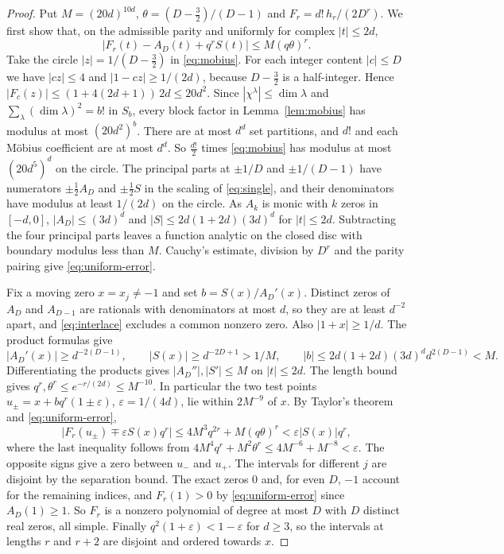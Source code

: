 \documentclass[11pt,a4paper]{article}
\theoremstyle{definition}\newtheorem{definition}[theorem]{Definition}
\theoremstyle{remark}\newtheorem{remark}[theorem]{Remark}\newtheorem{example}[theorem]{Example}
\numberwithin{equation}{section}
\begin{document}
\begin{proof}
Put $M=(20d)^{10d}$, $\theta=(D-\frac32)/(D-1)$ and $F_r=d!\,h_r/(2D^r)$. We first show that, on the admissible parity and uniformly for complex $|t|\le2d$,
\begin{equation}\label{eq:uniform-error}
 \bigl|F_r(t)-A_D(t)+q^rS(t)\bigr|\le M(q\theta)^r .
\end{equation}
Take the circle $|z|=1/(D-\frac32)$ in \eqref{eq:mobius}. For each integer content $|c|\le D$ we have $|cz|\le4$ and $|1-cz|\ge1/(2d)$, because $D-\frac32$ is a half-integer. Hence $|F_c(z)|\le(1+4(2d+1))\,2d\le20d^2$. Since $|\chi^\lambda|\le\dim\lambda$ and $\sum_\lambda(\dim\lambda)^2=b!$ in $S_b$, every block factor in Lemma~\ref{lem:mobius} has modulus at most $(20d^2)^b$. There are at most $d^d$ set partitions, and $d!$ and each Möbius coefficient are at most $d^d$. So $\frac{d!}2$ times \eqref{eq:mobius} has modulus at most $(20d^5)^d$ on the circle. The principal parts at $\pm1/D$ and $\pm1/(D-1)$ have numerators $\pm\frac12A_D$ and $\pm\frac12S$ in the scaling of \eqref{eq:single}, and their denominators have modulus at least $1/(2d)$ on the circle. As $A_k$ is monic with $k$ zeros in $[-d,0]$, $|A_D|\le(3d)^d$ and $|S|\le2d(1+2d)(3d)^d$ for $|t|\le2d$. Subtracting the four principal parts leaves a function analytic on the closed disc with boundary modulus less than $M$. Cauchy's estimate, division by $D^r$ and the parity pairing give \eqref{eq:uniform-error}.

Fix a moving zero $x=x_j\ne-1$ and set $b=S(x)/A_D'(x)$. Distinct zeros of $A_D$ and $A_{D-1}$ are rationals with denominators at most $d$, so they are at least $d^{-2}$ apart, and \eqref{eq:interlace} excludes a common nonzero zero. Also $|1+x|\ge1/d$. The product formulas give
\[
 |A_D'(x)|\ge d^{-2(D-1)},\qquad |S(x)|\ge d^{-2D+1}>1/M,\qquad |b|\le2d(1+2d)(3d)^dd^{2(D-1)}<M .
\]
Differentiating the products gives $|A_D''|,|S'|\le M$ on $|t|\le2d$. The length bound gives $q^r,\theta^r\le e^{-r/(2d)}\le M^{-10}$. In particular the two test points $u_\pm=x+bq^r(1\pm\varepsilon)$, $\varepsilon=1/(4d)$, lie within $2M^{-9}$ of $x$. By Taylor's theorem and \eqref{eq:uniform-error},
\[
 \bigl|F_r(u_\pm)\mp\varepsilon S(x)q^r\bigr|\le4M^3q^{2r}+M(q\theta)^r<\varepsilon|S(x)|q^r,
\]
where the last inequality follows from $4M^4q^r+M^2\theta^r\le4M^{-6}+M^{-8}<\varepsilon$. The opposite signs give a zero between $u_-$ and $u_+$. The intervals for different $j$ are disjoint by the separation bound. The exact zeros $0$ and, for even $D$, $-1$ account for the remaining indices, and $F_r(1)>0$ by \eqref{eq:uniform-error} since $A_D(1)\ge1$. So $F_r$ is a nonzero polynomial of degree at most $D$ with $D$ distinct real zeros, all simple. Finally $q^2(1+\varepsilon)<1-\varepsilon$ for $d\ge3$, so the intervals at lengths $r$ and $r+2$ are disjoint and ordered towards $x$.
\end{proof}
\end{document}
